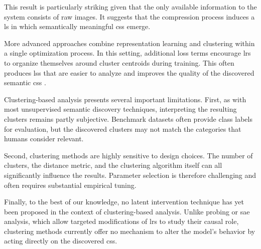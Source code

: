 

This result is particularly striking given that the only available information to the system consists of raw images.
It suggests that the compression process induces a \gls{ls} in which semantically meaningful \glspl{cs} emerge.

More advanced approaches combine representation learning and clustering within a single optimization process.
In this setting, additional loss terms encourage \glspl{lr} to organize themselves around cluster centroids during training.
This often produces \glspl{ls} that are easier to analyze and improves the quality of the discovered semantic \glspl{cs} \parencite{guo_improved_2017, miklautz_breaking_2024}.

Clustering-based analysis presents several important limitations.
First, as with most unsupervised semantic discovery techniques, interpreting the resulting clusters remains partly subjective.
Benchmark datasets often provide class labels for evaluation, but the discovered clusters may not match the categories that humans consider relevant. 

Second, clustering methods are highly sensitive to design choices.
The number of clusters, the distance metric, and the clustering algorithm itself can all significantly influence the results.
Parameter selection is therefore challenging and often requires substantial empirical tuning.

Finally, to the best of our knowledge, no latent intervention technique has yet been proposed in the context of clustering-based analysis.
Unlike probing or \gls{sae} analysis, which allow targeted modifications of \glspl{lr} to study their causal role, clustering methods currently offer no mechanism to alter the model's behavior by acting directly on the discovered \glspl{cs}.
